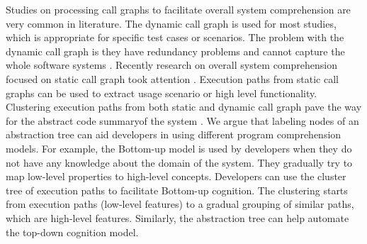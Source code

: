 Studies \cite{cornelissen2007understandingMassiveSequence, feng2018hierarchicalExecutionComprehension, reiss2005dynamicSoftwarePhases, watanabe2008featurePhaseDetection} on processing call graphs to facilitate overall system comprehension are very common in literature. The dynamic call graph is used for most studies, which is appropriate for specific test cases or scenarios. The problem with the dynamic call graph is they have redundancy problems and cannot capture the whole software systems \cite{gharibi2018automaticStaticCluster}. Recently research on overall system comprehension focused on static call graph took attention \cite{gharibi2018automaticStaticCluster, walunj2019graphevoEvolutionCall}. Execution paths from static call graphs \cite{pradel2009automaticUseageSpecification, salah2005scenariographerReverseEngineering} can be used to extract usage scenario or high level functionality. Clustering execution paths from both static and dynamic call graph pave the way for the abstract code summaryof the system \cite{feng2018hierarchicalExecutionComprehension, gharibi2018automaticStaticCluster}. We argue that labeling nodes of an abstraction tree  can aid developers in using different program comprehension models. For example, the Bottom-up model is used by developers when they do not have any knowledge about the domain of the system. They gradually try to map low-level properties to high-level concepts. Developers can use the cluster tree of execution paths to facilitate Bottom-up cognition. The clustering starts from execution paths (low-level features) to a gradual grouping of similar paths, which are high-level features. Similarly, the abstraction tree can help automate the top-down cognition model. 

